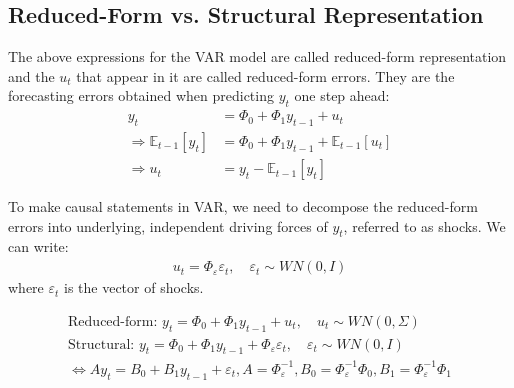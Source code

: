 \subsection{Reduced-Form vs. Structural Representation}
The above expressions for the VAR model are called reduced-form representation and the $u_t$ that appear in it are called reduced-form errors.
They are the forecasting errors obtained when predicting $y_t$ one step ahead:
\begin{align*}
    y_t &= \Phi_0 + \Phi_1 y_{t-1} + u_t \\
    \Rightarrow \mathbb{E}_{t-1} [y_t] &= \Phi_0 + \Phi_1 y_{t-1} + \mathbb{E}_{t-1} [u_t]\\
    \Rightarrow u_t &= y_t - \mathbb{E}_{t-1} [y_t]
\end{align*}

To make causal statements in VAR, we need to decompose the reduced-form errors into underlying, independent driving forces of $y_t$, referred to as shocks.
We can write:
\begin{gather*}
    u_t = \Phi_{\varepsilon} \varepsilon_t, \quad \varepsilon_t \sim WN(0, I)
\end{gather*}
where $\varepsilon_t$ is the vector of shocks.

\begin{gather*}
    \text{Reduced-form: } y_t = \Phi_0 + \Phi_1 y_{t-1} + u_t, \quad u_t \sim WN(0, \Sigma) \\
    \text{Structural: } y_t = \Phi_0 + \Phi_1 y_{t-1} + \Phi_{\varepsilon} \varepsilon_t, \quad \varepsilon_t \sim WN(0, I) \\
    \Leftrightarrow A y_t = B_0 + B_1 y_{t-1} + \varepsilon_t, A = \Phi_{\varepsilon}^{-1} , B_0 = \Phi_{\varepsilon}^{-1} \Phi_0, B_1 = \Phi_{\varepsilon}^{-1} \Phi_1
\end{gather*}

